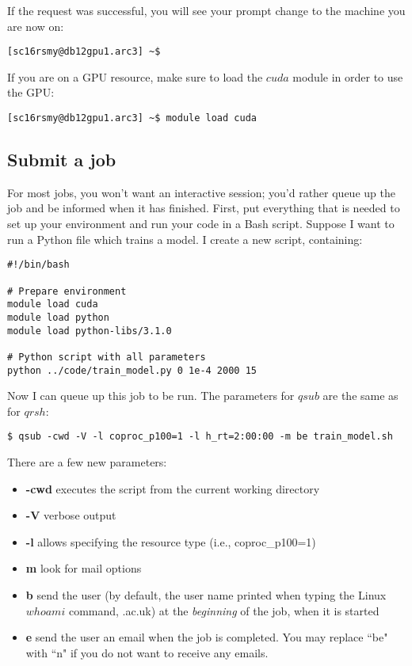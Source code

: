 \documentclass[]{article}
\begin{document}
If the request was successful, you will see your prompt change to the machine you are now on:

\begin{lstlisting}
[sc16rsmy@db12gpu1.arc3] ~$
\end{lstlisting}

If you are on a GPU resource, make sure to load the \(cuda\) module in order to use the GPU:

\begin{lstlisting}
[sc16rsmy@db12gpu1.arc3] ~$ module load cuda
\end{lstlisting}

\subsection{Submit a job}

For most jobs, you won't want an interactive session; you'd rather queue up the job and be informed when it has finished. First, put everything that is needed to set up your environment and run your code in a Bash script. Suppose I want to run a Python file which trains a model. I create a new script, containing:

\begin{lstlisting}
#!/bin/bash

# Prepare environment
module load cuda
module load python
module load python-libs/3.1.0

# Python script with all parameters
python ../code/train_model.py 0 1e-4 2000 15                      
\end{lstlisting}

Now I can queue up this job to be run. The parameters for \(qsub\) are the same as for \(qrsh\):

\begin{lstlisting}
$ qsub -cwd -V -l coproc_p100=1 -l h_rt=2:00:00 -m be train_model.sh
\end{lstlisting}

There are a few new parameters:
\begin{itemize}
	\item \textbf{-cwd} executes the script from the current working directory
	\item \textbf{-V} verbose output
	\item \textbf{-l} allows specifying the resource type (i.e., coproc\_p100=1)
	\item \textbf{m} look for mail options
	\item \textbf{b} send the user (by default, the user name printed when typing the Linux \(whoami\) command, \@leeds.ac.uk) at the \textit{beginning} of the job, when it is started
	\item \textbf{e} send the user an email when the job is completed. You may replace ``be" with ``n" if you do not want to receive any emails.
\end{itemize}
\end{document}
